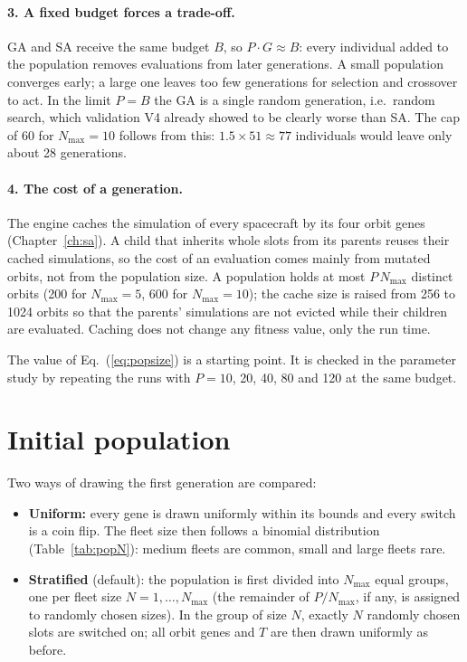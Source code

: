 \paragraph{3. A fixed budget forces a trade-off.} \ac{GA} and \ac{SA} receive the same budget
$B$, so $P\cdot G\approx B$: every individual added to the population removes evaluations from
later generations. A small population converges early; a large one leaves too few generations
for selection and crossover to act. In the limit $P=B$ the \ac{GA} is a single random generation,
i.e.\ random search, which validation V4 already showed to be clearly worse than \ac{SA}. The cap
of 60 for $N_{\max}=10$ follows from this: $1.5\times51\approx77$ individuals would leave only about
28 generations.

\paragraph{4. The cost of a generation.} The engine caches the simulation of every spacecraft by
its four orbit genes (Chapter~\ref{ch:sa}). A child that inherits whole slots from its parents
reuses their cached simulations, so the cost of an evaluation comes mainly from mutated orbits,
not from the population size. A population holds at most $P\,N_{\max}$ distinct orbits (200 for
$N_{\max}=5$, 600 for $N_{\max}=10$); the cache size is raised from 256 to 1024 orbits so that the
parents' simulations are not evicted while their children are evaluated. Caching does not change
any fitness value, only the run time.

The value of Eq.~(\ref{eq:popsize}) is a starting point. It is checked in the parameter study by
repeating the runs with $P=10$, 20, 40, 80 and 120 at the same budget.

\section{Initial population}
\label{sec:ga-init}

Two ways of drawing the first generation are compared:
\begin{itemize}
  \item \textbf{Uniform:} every gene is drawn uniformly within its bounds and every switch is a
        coin flip. The fleet size then follows a binomial distribution (Table~\ref{tab:popN}):
        medium fleets are common, small and large fleets rare.
  \item \textbf{Stratified} (default): the population is first divided into $N_{\max}$ equal
        groups, one per fleet size $N=1,\dots,N_{\max}$ (the remainder of $P/N_{\max}$, if any, is
        assigned to randomly chosen sizes). In the group of size $N$, exactly $N$ randomly chosen
        slots are switched on; all orbit genes and $T$ are then drawn uniformly as before.
\end{itemize}

